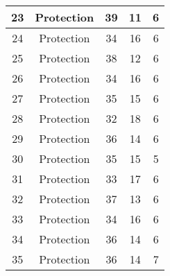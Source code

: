 \documentclass[results.tex]{subfiles}
\begin{document}
\begin{center}
\begin{tabular}{| c || c | c | c | c |}
            \hline
            23                      & Protection                   & 39                     & 11                      & 6                    \\
            \hline
            24                      & Protection                   & 34                     & 16                      & 6                    \\
            \hline
            25                      & Protection                   & 38                     & 12                      & 6                    \\
            \hline
            26                      & Protection                   & 34                     & 16                      & 6                    \\
            \hline
            27                      & Protection                   & 35                     & 15                      & 6                    \\
            \hline
            28                      & Protection                   & 32                     & 18                      & 6                    \\
            \hline
            29                      & Protection                   & 36                     & 14                      & 6                    \\
            \hline
            30                      & Protection                   & 35                     & 15                      & 5                    \\
            \hline
            31                      & Protection                   & 33                     & 17                      & 6                    \\
            \hline
            32                      & Protection                   & 37                     & 13                      & 6                    \\
            \hline
            33                      & Protection                   & 34                     & 16                      & 6                    \\
            \hline
            34                      & Protection                   & 36                     & 14                      & 6                    \\
            \hline
            35                      & Protection                   & 36                     & 14                      & 7                    \\

\end{tabular}
\end{center}
\end{document}
